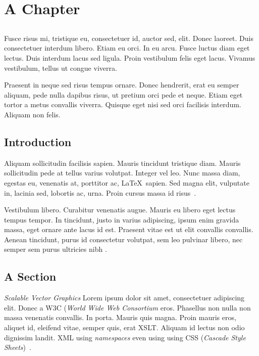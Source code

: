 \chapter{A Chapter} \label{chap:sota}

\section*{}

Fusce risus mi, tristique eu, consectetuer id, auctor sed, elit.
Donec laoreet. Duis consectetuer interdum libero. Etiam eu orci.
In eu arcu. Fusce luctus diam eget lectus.
Duis interdum lacus sed ligula. Proin vestibulum felis eget lacus.
Vivamus vestibulum, tellus ut congue viverra.

Praesent in neque sed risus tempus ornare. Donec hendrerit, erat eu
semper aliquam, pede nulla dapibus risus, ut pretium orci pede et
neque. 
Etiam eget tortor a metus convallis viverra. Quisque eget nisi sed
orci facilisis interdum. Aliquam non felis. 

\section{Introduction}

Aliquam sollicitudin facilisis sapien. Mauris tincidunt tristique
diam. Mauris sollicitudin pede at tellus varius volutpat. Integer vel
leo. Nunc massa diam, egestas eu, venenatis at, porttitor ac, \LaTeX\ 
sapien. Sed magna elit, vulputate in, lacinia sed, lobortis ac,
urna. Proin cursus massa id risus~\cite{kn:MVL06-xata}.

Vestibulum libero. Curabitur venenatis augue. Mauris eu libero eget
lectus tempus tempor.
In tincidunt, justo in varius adipiscing, ipsum enim gravida massa,
eget ornare ante lacus id est. Praesent vitae est ut elit convallis
convallis.
Aenean tincidunt, purus id consectetur volutpat, sem leo pulvinar
libero, nec semper sem purus ultricies nibh \cite{kn:Fra94-thesis}.  

\section{A Section}\label{sec:theoback}

\emph{Scalable Vector Graphics} Lorem ipsum
dolor sit amet, consectetuer adipiscing elit.
Donec a W3C (\emph{World Wide Web Consortium} eros.
Phasellus non nulla non massa venenatis convallis.
In porta. Mauris quis magna. Proin mauris eros, aliquet id, eleifend
vitae, semper quis, erat XSLT\index{XML!XSLT}.
Aliquam id lectus non odio dignissim landit.
XML using \textit{namespaces} even using \svg{} using
CSS\index{CSS} (\emph{Cascade Style   Sheets})~\cite{kn:svgw3c}.  


